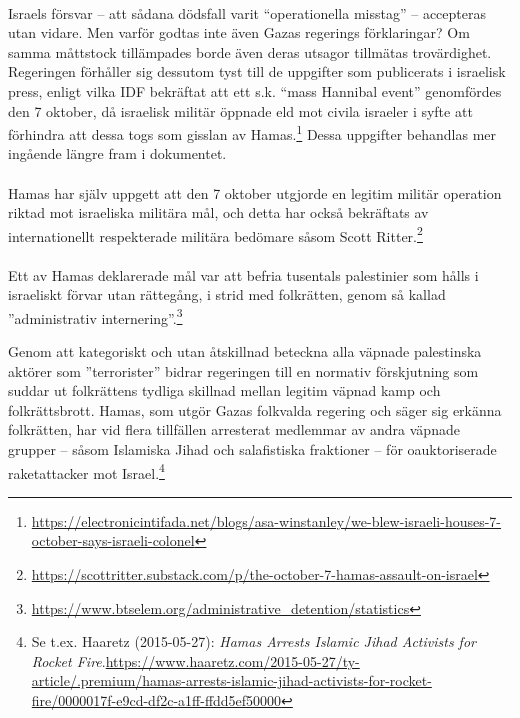 \paragraph{}
Israels försvar – att sådana dödsfall varit \enquote{operationella misstag} – accepteras utan vidare. Men varför godtas inte även Gazas regerings förklaringar? Om samma måttstock tillämpades borde även deras utsagor tillmätas trovärdighet.
Regeringen förhåller sig dessutom tyst till de uppgifter som publicerats i israelisk press, 
enligt vilka IDF bekräftat att ett s.k. \enquote{mass Hannibal event} genomfördes den 7 oktober, 
då israelisk militär öppnade eld mot civila israeler i syfte att förhindra att dessa togs som 
gisslan av Hamas.\footnote{\url{https://electronicintifada.net/blogs/asa-winstanley/we-blew-israeli-houses-7-october-says-israeli-colonel}} Dessa uppgifter behandlas mer ingående längre fram i dokumentet.

\paragraph{}
Hamas har själv uppgett att den 7 oktober utgjorde en legitim militär operation riktad mot israeliska militära mål, 
och detta har också bekräftats av internationellt respekterade militära bedömare såsom 
Scott Ritter.\footnote{\url{https://scottritter.substack.com/p/the-october-7-hamas-assault-on-israel}} 

\paragraph{}
Ett av Hamas deklarerade mål var att befria tusentals palestinier som hålls i israeliskt förvar utan rättegång, 
i strid med folkrätten, genom så kallad ”administrativ internering”.\footnote{\url{https://www.btselem.org/administrative_detention/statistics}}

Genom att kategoriskt och utan åtskillnad beteckna alla väpnade palestinska aktörer som ”terrorister” 
bidrar regeringen till en normativ förskjutning som suddar ut folkrättens tydliga skillnad mellan legitim väpnad kamp och folkrättsbrott. 
Hamas, som utgör Gazas folkvalda regering och säger sig erkänna folkrätten, 
har vid flera tillfällen arresterat medlemmar av andra väpnade grupper – såsom Islamiska Jihad 
och salafistiska fraktioner – för oauktoriserade raketattacker 
mot Israel.\footnote{Se t.ex. Haaretz (2015-05-27): \textit{Hamas Arrests Islamic Jihad Activists for Rocket Fire}.\url{https://www.haaretz.com/2015-05-27/ty-article/.premium/hamas-arrests-islamic-jihad-activists-for-rocket-fire/0000017f-e9cd-df2c-a1ff-ffdd5ef50000}}

